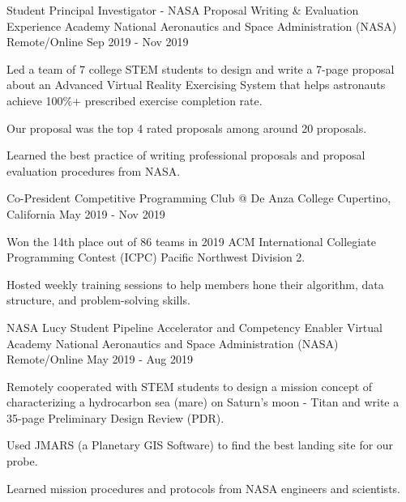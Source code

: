 \begin{cventries}
  \cventry
    {Student Principal Investigator - NASA Proposal Writing \& Evaluation Experience Academy} %
    {National Aeronautics and Space Administration (NASA)} %
    {Remote/Online} %
    {Sep 2019 - Nov 2019} %
    {
	\begin{cvitems} %
      	\item Led a team of 7 college STEM students to design and write a 7-page proposal about an Advanced Virtual Reality Exercising System that helps astronauts achieve 100\%+ prescribed exercise completion rate. 
      	\item Our proposal was the top 4 rated proposals among around 20 proposals.
      	\item Learned the best practice of writing professional proposals and proposal evaluation procedures from NASA.
	\end{cvitems}
    }
    
  \cventry
    {Co-President} %
    {Competitive Programming Club @ De Anza College} %
    {Cupertino, California} %
    {May 2019 - Nov 2019} %
    {
	\begin{cvitems} %
      	\item Won the 14th place out of 86 teams in 2019 ACM International Collegiate Programming Contest (ICPC) Pacific Northwest Division 2. 
      	\item Hosted weekly training sessions to help members hone their algorithm, data structure, and problem-solving skills. 
	\end{cvitems}
    }    
    
    \cventry
    {NASA Lucy Student Pipeline Accelerator and Competency Enabler Virtual Academy} %
    {National Aeronautics and Space Administration (NASA)} %
    {Remote/Online} %
    {May 2019 - Aug 2019} %
    {
	\begin{cvitems} %
      	\item Remotely cooperated with STEM students to design a mission concept of characterizing a hydrocarbon sea (mare) on Saturn’s moon - Titan and write a 35-page Preliminary Design Review (PDR). 
      	\item Used JMARS (a Planetary GIS Software) to find the best landing site for our probe.
      	\item Learned mission procedures and protocols from NASA engineers and scientists. 
	\end{cvitems}
    }  
    

\end{cventries}

